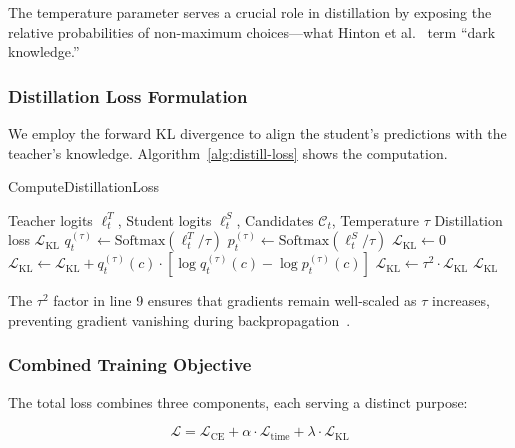 The temperature parameter serves a crucial role in distillation by exposing the relative probabilities of non-maximum choices---what Hinton et al.~\cite{hintonDistillingKnowledgeNeural2015} term ``dark knowledge.''

\subsubsection{Distillation Loss Formulation}
\label{sec:method-kl}
We employ the forward KL divergence to align the student's predictions with the teacher's knowledge. Algorithm~\ref{alg:distill-loss} shows the computation.

\begin{algorithm}[t]
\caption{ComputeDistillationLoss}
\label{alg:distill-loss}
\begin{algorithmic}
\Require Teacher logits $\ell^T_t$, Student logits $\ell^S_t$, Candidates $\mathcal{C}_t$, Temperature $\tau$
\Ensure Distillation loss $\mathcal{L}_{\text{KL}}$
\State $q^{(\tau)}_t \gets \text{Softmax}(\ell^T_t / \tau)$ 
\State $p^{(\tau)}_t \gets \text{Softmax}(\ell^S_t / \tau)$ 
\State $\mathcal{L}_{\text{KL}} \gets 0$
     
        \State $\mathcal{L}_{\text{KL}} \gets \mathcal{L}_{\text{KL}} + q^{(\tau)}_t(c) \cdot [\log q^{(\tau)}_t(c) - \log p^{(\tau)}_t(c)]$
    \EndIf
\EndFor
\State $\mathcal{L}_{\text{KL}} \gets \tau^2 \cdot \mathcal{L}_{\text{KL}}$ 
\State \Return $\mathcal{L}_{\text{KL}}$
\end{algorithmic}
\end{algorithm}

\begin{remark}
The $\tau^2$ factor in line 9 ensures that gradients remain well-scaled as $\tau$ increases, preventing gradient vanishing during backpropagation~\cite{hintonDistillingKnowledgeNeural2015}.
\end{remark}

\subsubsection{Combined Training Objective}
\label{sec:method-combined}
The total loss combines three components, each serving a distinct purpose:

\begin{equation}
\mathcal{L} = \mathcal{L}_{\text{CE}} + \alpha \cdot \mathcal{L}_{\text{time}} + \lambda \cdot \mathcal{L}_{\text{KL}}
\label{eq:total-loss}
\end{equation}

